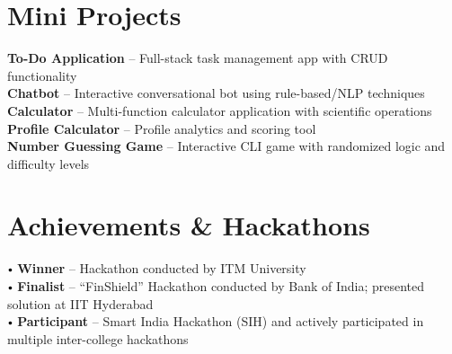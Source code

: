 \documentclass[a4paper,11pt]{extarticle}
\begin{document}
\section{Mini Projects}
 \begin{itemize}[leftmargin=0.15in, label={}]
    \small{\item{
      \textbf{To-Do Application} -- Full-stack task management app with CRUD functionality \\
      \textbf{Chatbot} -- Interactive conversational bot using rule-based/NLP techniques \\
      \textbf{Calculator} -- Multi-function calculator application with scientific operations \\
      \textbf{Profile Calculator} -- Profile analytics and scoring tool \\
      \textbf{Number Guessing Game} -- Interactive CLI game with randomized logic and difficulty levels
    }}
 \end{itemize}

\section{Achievements \& Hackathons}
 \begin{itemize}[leftmargin=0.15in, label={}]
    \small{\item{
      $\vcenter{\hbox{\tiny$\bullet$}}$ \textbf{Winner} -- Hackathon conducted by ITM University \\
      $\vcenter{\hbox{\tiny$\bullet$}}$ \textbf{Finalist} -- ``FinShield'' Hackathon conducted by Bank of India; presented solution at IIT Hyderabad \\
      $\vcenter{\hbox{\tiny$\bullet$}}$ \textbf{Participant} -- Smart India Hackathon (SIH) and actively participated in multiple inter-college hackathons
    }}
 \end{itemize}

\end{document}
